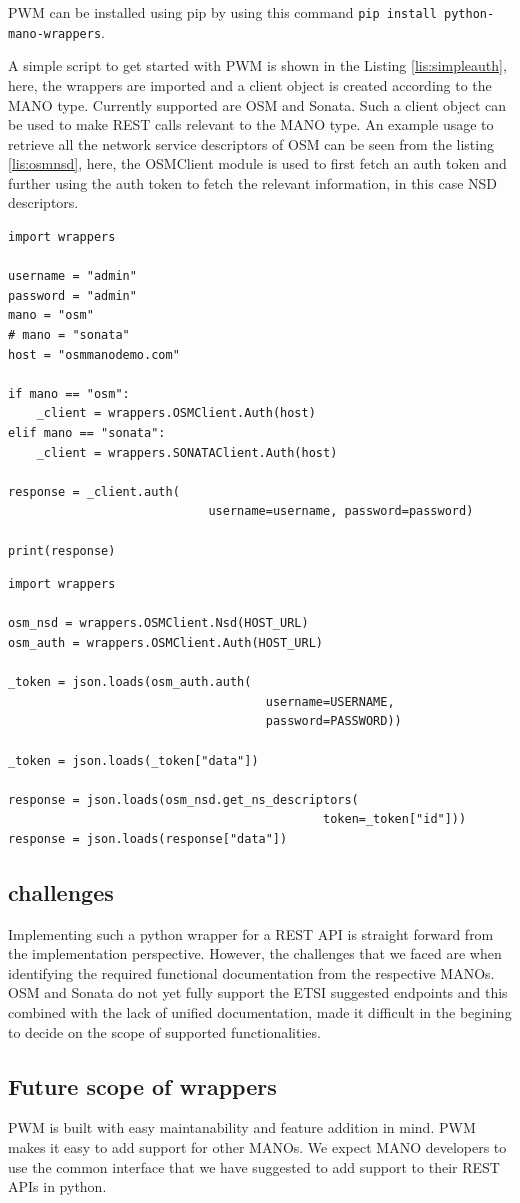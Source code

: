 PWM can be installed using pip by using this command \texttt{pip install python-mano-wrappers}. 

A simple script to get started with PWM is shown in the Listing \ref{lis:simpleauth}, here, the wrappers are imported and a client object is created according to the MANO type. 
Currently supported are OSM and Sonata. 
Such a client object can be used to make REST calls relevant to the MANO type. 
An example usage to retrieve all the network service descriptors of OSM can be seen from the listing \ref{lis:osmnsd}, here, the OSMClient module is used to first fetch an auth token and further using the auth token to fetch the relevant information, in this case NSD descriptors.


\begin{lstlisting}[caption=Simple wrapper code to fetch token, label=lis:simpleauth]
import wrappers

username = "admin"
password = "admin"
mano = "osm"
# mano = "sonata"
host = "osmmanodemo.com"

if mano == "osm":
	_client = wrappers.OSMClient.Auth(host)
elif mano == "sonata":
	_client = wrappers.SONATAClient.Auth(host)

response = _client.auth(
							username=username, password=password)

print(response)

\end{lstlisting}

\begin{lstlisting}[caption=Code to fetch all NSDs in OSM, label=lis:osmnsd]
import wrappers

osm_nsd = wrappers.OSMClient.Nsd(HOST_URL)
osm_auth = wrappers.OSMClient.Auth(HOST_URL)

_token = json.loads(osm_auth.auth(
									username=USERNAME,
									password=PASSWORD))

_token = json.loads(_token["data"])

response = json.loads(osm_nsd.get_ns_descriptors(
											token=_token["id"]))
response = json.loads(response["data"])
\end{lstlisting}

\subsection{challenges}

Implementing such a python wrapper for a REST API is straight forward from the implementation perspective. 
However, the challenges that we faced are when identifying the required functional documentation from the respective MANOs. 
OSM and Sonata do not yet fully support the ETSI suggested endpoints and this combined with the lack of unified documentation, made it difficult in the begining to decide on the scope of supported functionalities.\\
  

\subsection{Future scope of wrappers}

PWM is built with easy maintanability and feature addition in mind. 
PWM makes it easy to add support for other MANOs. 
We expect MANO developers to use the common interface that we have suggested to add support to their REST APIs in python.

 
